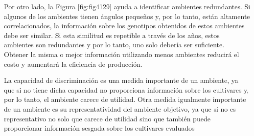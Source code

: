 Por otro lado, la Figura \ref{fig:fig4129} ayuda a identificar ambientes redundantes. Si algunos de los ambientes tienen ángulos pequeños y, por lo tanto, están altamente correlacionados, la información sobre los genotipos obtenidos de estos ambientes debe ser similar. Si esta similitud es repetible a través de los años, estos ambientes son redundantes y por lo tanto, uno solo debería ser suficiente. Obtener la misma o mejor información utilizando menos ambientes reducirá el costo y aumentará la eficiencia de producción.



La capacidad de discriminación es una medida importante de un ambiente, ya que si no tiene dicha capacidad no proporciona información sobre los cultivares y, por lo tanto, el ambiente carece de utilidad. Otra medida igualmente importante de un ambiente es su representatividad del ambiente objetivo, ya que si no es representativo no solo que carece de utilidad sino que también puede proporcionar información sesgada sobre los cultivares evaluados


